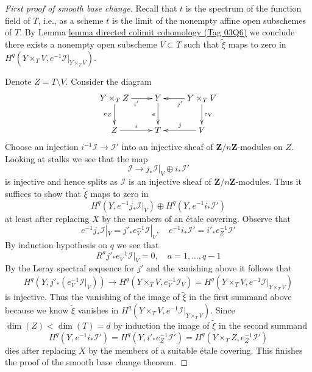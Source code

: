 \documentclass{amsart}
\theoremstyle{plain}
\theoremstyle{definition}
\theoremstyle{remark}
\numberwithin{equation}{subsection}
\begin{document}
\begin{proof}[First proof of smooth base change]
\medskip\noindent
Recall that $t$ is the spectrum of the function field of $T$, i.e.,
as a scheme $t$ is the limit of the nonempty affine open subschemes of $T$.
By Lemma \href{https://stacks.math.columbia.edu/tag/03Q6}{lemma directed colimit cohomology (Tag 03Q6)} we conclude there exists
a nonempty open subscheme $V \subset T$ such that $\tilde \xi$ maps to zero in
$H^q(Y \times_T V, e^{-1}\mathcal{I}|_{Y \times_T V})$.

\medskip\noindent
Denote $Z = T \setminus V$. Consider the diagram
$$
\xymatrix{
Y \times_T Z \ar[d]_{e_Z} \ar[r]_{i'} &
Y \ar[d]_e &
Y \times_T V \ar[l]^{j'} \ar[d]^{e_V} \\
Z \ar[r]^i &
T &
V \ar[l]_j
}
$$
Choose an injection $i^{-1}\mathcal{I} \to \mathcal{I}'$
into an injective sheaf of $\mathbf{Z}/n\mathbf{Z}$-modules on $Z$.
Looking at stalks we see that the map
$$
\mathcal{I} \to j_*\mathcal{I}|_V \oplus i_*\mathcal{I}'
$$
is injective and hence splits as $\mathcal{I}$ is an injective sheaf
of $\mathbf{Z}/n\mathbf{Z}$-modules. Thus it suffices to show that
$\tilde \xi$ maps to zero in
$$
H^q(Y, e^{-1}j_*\mathcal{I}|_V) \oplus
H^q(Y, e^{-1}i_*\mathcal{I}')
$$
at least after replacing $X$ by the members of an \'etale covering.
Observe that
$$
e^{-1}j_*\mathcal{I}|_V = j'_*e_V^{-1}\mathcal{I}|_V,\quad
e^{-1}i_*\mathcal{I}' = i'_*e_Z^{-1}\mathcal{I}'
$$
By induction hypothesis on $q$ we see that
$$
R^aj'_*e_V^{-1}\mathcal{I}|_V = 0, \quad a = 1, \ldots, q - 1
$$
By the Leray spectral sequence for $j'$ and the vanishing
above it follows that
$$
H^q(Y, j'_*(e_V^{-1}\mathcal{I}|_V))
\longrightarrow
H^q(Y \times_T V, e_V^{-1}\mathcal{I}_V) =
H^q(Y \times_T V, e^{-1}\mathcal{I}|_{Y \times_T V})
$$
is injective. Thus the vanishing of the image of $\tilde \xi$
in the first summand above because we know $\tilde \xi$ vanishes
in $H^q(Y \times_T V, e^{-1}\mathcal{I}|_{Y \times_T V})$.
Since $\dim(Z) < \dim(T) = d$ by induction the image of $\tilde \xi$
in the second summand
$$
H^q(Y, e^{-1}i_*\mathcal{I}') =
H^q(Y, i'_*e_Z^{-1}\mathcal{I}') =
H^q(Y \times_T Z, e_Z^{-1}\mathcal{I}')
$$
dies after replacing $X$ by the members of a suitable \'etale covering.
This finishes the proof of the smooth base change theorem.
\end{proof}
\end{document}
